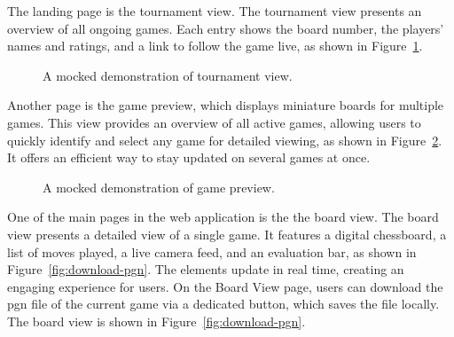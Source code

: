 The landing page is the tournament view. The tournament view presents an overview of all ongoing games. Each entry shows the board number, the players' names and ratings, and a link to follow the game live, as shown in Figure~\ref{fig:tournament-view-mocked}. \\

\begin{figure}[h!] \centering {}\caption[Display of tournament view]{A mocked demonstration of tournament view.}\label{fig:tournament-view-mocked} \end{figure}

Another page is the game preview, which displays miniature boards for multiple games. This view provides an overview of all active games, allowing users to quickly identify and select any game for detailed viewing, as shown in Figure~\ref{fig:game-preview}. It offers an efficient way to stay updated on several games at once. \\

\begin{figure}[h!] \centering {}\caption[Display of game preview]{A mocked demonstration of game preview.}\label{fig:game-preview} \end{figure}

One of the main pages in the web application is the the board view. The board view presents a detailed view of a single game. It features a digital chessboard, a list of moves played, a live camera feed, and an evaluation bar, as shown in Figure~\ref{fig:download-pgn}. The elements update in real time, creating an engaging experience for users. On the Board View page, users can download the \gls{pgn} file of the current game via a dedicated button, which saves the file locally. The board view is shown in Figure~\ref{fig:download-pgn}. \\

